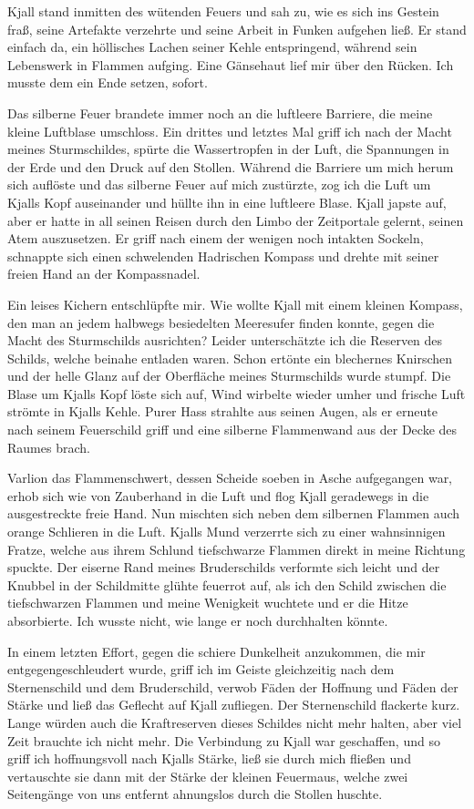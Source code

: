 \documentclass[10pt, a4paper, oneside]{book}
\begin{document}
Kjall stand inmitten des wütenden Feuers und sah zu, wie es sich ins Gestein fraß, seine Artefakte verzehrte und seine Arbeit in Funken aufgehen ließ. Er stand einfach da, ein höllisches Lachen seiner Kehle entspringend, während sein Lebenswerk in Flammen aufging. Eine Gänsehaut lief mir über den Rücken. Ich musste dem ein Ende setzen, sofort.

Das silberne Feuer brandete immer noch an die luftleere Barriere, die meine kleine Luftblase umschloss. Ein drittes und letztes Mal griff ich nach der Macht meines Sturmschildes, spürte die Wassertropfen in der Luft, die Spannungen in der Erde und den Druck auf den Stollen. Während die Barriere um mich herum sich auflöste und das silberne Feuer auf mich zustürzte, zog ich die Luft um Kjalls Kopf auseinander und hüllte ihn in eine luftleere Blase. Kjall japste auf, aber er hatte in all seinen Reisen durch den Limbo der Zeitportale gelernt, seinen Atem auszusetzen. Er griff nach einem der wenigen noch intakten Sockeln, schnappte sich einen schwelenden Hadrischen Kompass und drehte mit seiner freien Hand an der Kompassnadel.

Ein leises Kichern entschlüpfte mir. Wie wollte Kjall mit einem kleinen Kompass, den man an jedem halbwegs besiedelten Meeresufer finden konnte, gegen die Macht des Sturmschilds ausrichten? Leider unterschätzte ich die Reserven des Schilds, welche beinahe entladen waren. Schon ertönte ein blechernes Knirschen und der helle Glanz auf der Oberfläche meines Sturmschilds wurde stumpf. Die Blase um Kjalls Kopf löste sich auf, Wind wirbelte wieder umher und frische Luft strömte in Kjalls Kehle. Purer Hass strahlte aus seinen Augen, als er erneute nach seinem Feuerschild griff und eine silberne Flammenwand aus der Decke des Raumes brach.

Varlion das Flammenschwert, dessen Scheide soeben in Asche aufgegangen war, erhob sich wie von Zauberhand in die Luft und flog Kjall geradewegs in die ausgestreckte freie Hand. Nun mischten sich neben dem silbernen Flammen auch orange Schlieren in die Luft. Kjalls Mund verzerrte sich zu einer wahnsinnigen Fratze, welche aus ihrem Schlund tiefschwarze Flammen direkt in meine Richtung spuckte. Der eiserne Rand meines Bruderschilds verformte sich leicht und der Knubbel in der Schildmitte glühte feuerrot auf, als ich den Schild zwischen die tiefschwarzen Flammen und meine Wenigkeit wuchtete und er die Hitze absorbierte. Ich wusste nicht, wie lange er noch durchhalten könnte.

In einem letzten Effort, gegen die schiere Dunkelheit anzukommen, die mir entgegengeschleudert wurde, griff ich im Geiste gleichzeitig nach dem Sternenschild und dem Bruderschild, verwob Fäden der Hoffnung und Fäden der Stärke und ließ das Geflecht auf Kjall zufliegen. Der Sternenschild flackerte kurz. Lange würden auch die Kraftreserven dieses Schildes nicht mehr halten, aber viel Zeit brauchte ich nicht mehr. Die Verbindung zu Kjall war geschaffen, und so griff ich hoffnungsvoll nach Kjalls Stärke, ließ sie durch mich fließen und vertauschte sie dann mit der Stärke der kleinen Feuermaus, welche zwei Seitengänge von uns entfernt ahnungslos durch die Stollen huschte.
\end{document}
